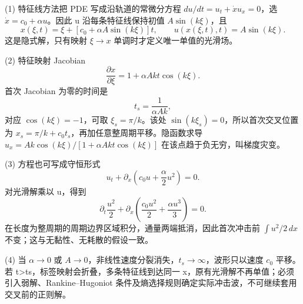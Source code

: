 (1) 特征线方法把 PDE 写成沿轨道的常微分方程 \(du/dt=u_t+\dot x u_x=0\)，选 \(\dot x=c_0+\alpha u\)。因此 u 沿每条特征线保持初值 \(A\sin(k\xi)\)，且
\[
x(\xi,t)=\xi+[c_0+\alpha A\sin(k\xi)]t,\qquad
u(x(\xi,t),t)=A\sin(k\xi).
\]
这是隐式解，只有映射 \(\xi \to x\) 单调时才定义唯一单值的光滑场。

(2) 特征映射 Jacobian
\[
\frac{\partial x}{\partial\xi}=1+\alpha Ak t\cos(k\xi).
\]
首次 Jacobian 为零的时间是
\[
t_s=\frac1{\alpha Ak},
\]
对应 \(\cos(k\xi)=-1\)，可取 \(\xi_s=\pi/k\)。该处 \(\sin(k\xi_s)=0\)，所以首次交叉位置为 \(x_s=\pi/k+c_0t_s\)，再加任意整周期平移。隐函数求导 \(u_x=Ak\cos(k\xi)/[1+\alpha Akt\cos(k\xi)]\) 在该点趋于负无穷，叫梯度灾变。

(3) 方程也可写成守恒形式
\[
u_t+\partial_x\left(c_0u+\frac{\alpha}{2}u^2\right)=0.
\]
对光滑解乘以 u，得到
\[
\partial_t\frac{u^2}{2}+
\partial_x\left(\frac{c_0u^2}{2}+\frac{\alpha u^3}{3}\right)=0.
\]
在长度为整周期的周期边界区域积分，通量两端抵消，因此首次冲击前 \(\int u^2/2\,dx\) 不变；这与无黏性、无耗散的假设一致。

(4) 当 \(\alpha \to 0\) 或 \(A\to 0\)，非线性速度分裂消失，\(t_s\to\infty\)，波形只以速度 \(c_{0}\) 平移。若 t>ts，标签映射会折叠，多条特征线到达同一 x，原有光滑解不再单值；必须引入弱解、Rankine–Hugoniot 条件及熵选择规则确定实际冲击波，不可继续套用交叉前的正则解。
